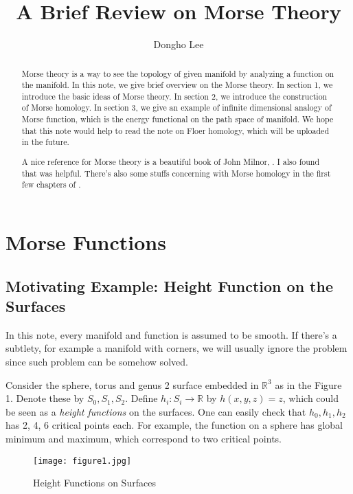 \documentclass{article}
\author{Dongho Lee}
\title{A Brief Review on Morse Theory}
\newcommand{\R}{\mathbb{R}}
\begin{document}
\maketitle

	\begin{abstract}
	Morse theory is a way to see the topology of given manifold by analyzing a function on the manifold.
	In this note, we give brief overview on the Morse theory.
	In section 1, we introduce the basic ideas of Morse theory.
	In section 2, we introduce the construction of Morse homology.
	In section 3, we give an example of infinite dimensional analogy of Morse function, which is the energy functional on the path space of manifold.
	We hope that this note would help to read the note on Floer homology, which will be uploaded in the future.
	
	A nice reference for Morse theory is a beautiful book of John Milnor, \cite{m1}.
	I also found that \cite{mat} was helpful.
	There's also some stuffs concerning with Morse homology in the first few chapters of \cite{ad}.
	\end{abstract}

\tableofcontents

\newpage

\section{Morse Functions}
\subsection{Motivating Example: Height Function on the Surfaces}
In this note, every manifold and function is assumed to be smooth.
If there's a subtlety, for example a manifold with corners, we will usually ignore the problem since such problem can be somehow solved.

Consider the sphere, torus and genus 2 surface embedded in $\R^3$ as in the Figure 1.
Denote these by $S_0,S_1,S_2$.
Define $h_i:S_i\to \R$ by $h(x,y,z)=z$, which could be seen as a \emph{height functions} on the surfaces.
One can easily check that $h_0,h_1,h_2$ has 2, 4, 6 critical points each.
For example, the function on a sphere has global minimum and maximum, which correspond to two critical points.

\begin{figure}[h]
		\centering
		\texttt{[image: figure1.jpg]}
		\caption{Height Functions on Surfaces}
\end{figure}
\end{document}
